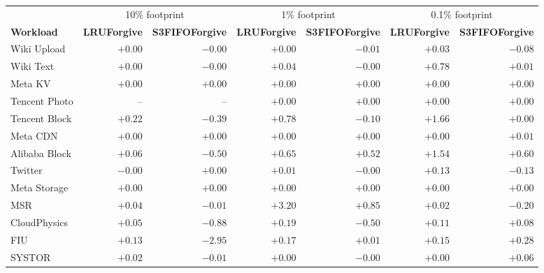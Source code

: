 \begin{tabular}{lrrrrrr}
\toprule
 & \multicolumn{2}{c}{10\% footprint} & \multicolumn{2}{c}{1\% footprint} & \multicolumn{2}{c}{0.1\% footprint} \\
\cmidrule(lr){2-3}\cmidrule(lr){4-5}\cmidrule(lr){6-7}
\textbf{Workload} & \textbf{LRUForgive} & \textbf{S3FIFOForgive} & \textbf{LRUForgive} & \textbf{S3FIFOForgive} & \textbf{LRUForgive} & \textbf{S3FIFOForgive} \\
\midrule
Wiki Upload & $+0.00$ & $-0.00$ & $+0.00$ & $-0.01$ & $+0.03$ & $-0.08$ \\
Wiki Text & $+0.00$ & $-0.00$ & $+0.04$ & $-0.00$ & $+0.78$ & $+0.01$ \\
Meta KV & $+0.00$ & $+0.00$ & $+0.00$ & $+0.00$ & $+0.00$ & $+0.00$ \\
Tencent Photo & -- & -- & $+0.00$ & $+0.00$ & $+0.00$ & $+0.00$ \\
Tencent Block & $+0.22$ & $-0.39$ & $+0.78$ & $-0.10$ & $+1.66$ & $+0.00$ \\
Meta CDN & $+0.00$ & $+0.00$ & $+0.00$ & $+0.00$ & $+0.00$ & $+0.01$ \\
Alibaba Block & $+0.06$ & $-0.50$ & $+0.65$ & $+0.52$ & $+1.54$ & $+0.60$ \\
Twitter & $-0.00$ & $+0.00$ & $+0.01$ & $-0.00$ & $+0.13$ & $-0.13$ \\
\midrule
Meta Storage & $+0.00$ & $+0.00$ & $+0.00$ & $+0.00$ & $+0.00$ & $+0.00$ \\
MSR & $+0.04$ & $-0.01$ & $+3.20$ & $+0.85$ & $+0.02$ & $-0.20$ \\
CloudPhysics & $+0.05$ & $-0.88$ & $+0.19$ & $-0.50$ & $+0.11$ & $+0.08$ \\
FIU & $+0.13$ & $-2.95$ & $+0.17$ & $+0.01$ & $+0.15$ & $+0.28$ \\
SYSTOR & $+0.02$ & $-0.01$ & $+0.00$ & $-0.00$ & $+0.00$ & $+0.06$ \\
\bottomrule
\end{tabular}
